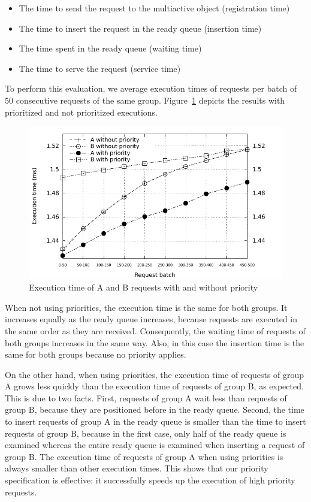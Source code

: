 \documentclass[11pt]{report}
\begin{document}
\begin{itemize}
\item The time to send the request to the multiactive object (registration time)
\item The time to insert the request in the ready queue (insertion time)
\item The time spent in the ready queue (waiting time)
\item The time to serve the request (service time)
\end{itemize}

To perform this evaluation, we average execution times of requests per batch of 50 consecutive requests of the same group. Figure~\ref{fig:effectivity} depicts the results with prioritized and not prioritized executions.
\begin{figure}[!ht]
      \begin{minipage}[c]{\textwidth}
      \centering
      \includegraphics[scale=1]{pictures/effectivity.pdf}
      \end{minipage}
      \caption{Execution time of A and B requests with and without priority}
      \label{fig:effectivity} 
\end{figure}
When not using priorities, the execution time is the same for both groups. It increases equally as the ready queue increases, because requests are executed in the same order as they are received. Consequently, the waiting time of requests of both groups increases in the same way. Also, in this case the insertion time is the same for both groups because no priority applies.

On the other hand, when using priorities, the execution time of requests of group A grows less quickly than the execution time of requests of group B, as expected. This is due to two facts. First, requests of group A wait less than requests of group B, because they are positioned before in the ready queue. Second, the time to insert requests of group A in the ready queue is smaller than the time to insert requests of group B, because in the first case, only half of the ready queue is examined whereas the entire ready queue is examined when inserting a request of group B. The execution time of requests of group A when using priorities is always smaller than other execution times. This shows that our priority specification is effective: it successfully speeds up the execution of high priority requests. 
\end{document}
